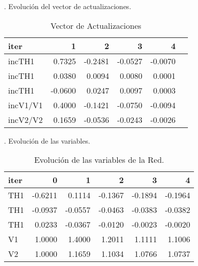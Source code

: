 \documentclass[a4paper,10pt,titlepage,oneside]{article}
\begin{document}
{. Evolución del vector de actualizaciones.
\begin{table}[htbp]
        \centering
    \begin{tabular}[c]{l r r r r r } 
        iter    &      1  &     2 &      3    &   4 \\
        \hline
        \rowcolor[gray]{0.8} incTH1 &   0.7325 &-0.2481 &-0.0527 &-0.0070\\
        \hline
        \rowcolor[gray]{0.6} incTH1  & 0.0380 & 0.0094 & 0.0080 & 0.0001\\
        \hline
        \rowcolor[gray]{0.8} incTH1  &-0.0600 &  0.0247 & 0.0097 &  0.0003\\
        \hline
        \rowcolor[gray]{0.6} incV1/V1  &0.4000 &-0.1421 &-0.0750 &-0.0094\\
        \hline
        \rowcolor[gray]{0.8} incV2/V2  & 0.1659 &-0.0536& -0.0243 &-0.0026\\
        \hline
    \end{tabular}
   \caption{Vector de Actualizaciones}
\end{table}

. Evolución de las variables.
\begin{table}[htbp]
        \centering
    \begin{tabular}[c]{l r r r r r } 
         iter    &0&      1  &     2 &      3    &   4 \\
        \hline
        \rowcolor[gray]{0.8} TH1 &   -0.6211 & 0.1114 &-0.1367& -0.1894& -0.1964\\
        \hline
        \rowcolor[gray]{0.6} TH1  &-0.0937 &-0.0557& -0.0463 &-0.0383& -0.0382\\
        \hline
         \rowcolor[gray]{0.8} TH1 & 0.0233& -0.0367 & -0.0120& -0.0023& -0.0020\\
        \hline
        \rowcolor[gray]{0.6} V1  &1.0000 & 1.4000 & 1.2011 & 1.1111 & 1.1006\\
        \hline
         \rowcolor[gray]{0.8}V2  & 1.0000 & 1.1659 & 1.1034 & 1.0766 & 1.0737\\
        \hline
    \end{tabular}
   \caption{Evolución de las variables de la Red.}
\end{table}

}
\end{document}
